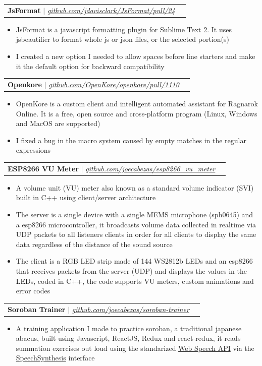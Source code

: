 \documentclass[letterpaper,11pt]{article}
\makeatletter
\newcommand{\resumeItem}[1]{
  \item\small{
    {#1 \vspace{-2pt}}
  }
}
\newcommand{\resumeProjectHeading}[2]{
    \vspace{-2pt}\item
    \begin{tabular*}{0.97\textwidth}{l@{\extracolsep{\fill}}r}
      \small#1 & #2 \\
    \end{tabular*}\vspace{-7pt}
}
\newcommand{\resumeItemListStart}{\begin{itemize}}
\newcommand{\resumeItemListEnd}{\end{itemize}\vspace{-5pt}}
\makeatother
\begin{document}
      \resumeProjectHeading
        {\textbf{JsFormat} $|$ \emph{\href{https://github.com/jdavisclark/JsFormat/pull/24}{\color{blue}github.com/jdavisclark/JsFormat/pull/24}}}{}
          \resumeItemListStart
            \resumeItem{JsFormat is a javascript formatting plugin for Sublime Text 2. It uses jsbeautifier to format whole js or json files, or the selected portion(s)}
            \resumeItem{I created a new option I needed to allow spaces before line starters and make it the default option for backward compatibility}
          \resumeItemListEnd
      
      \resumeProjectHeading
        {\textbf{Openkore} $|$ \emph{\href{https://github.com/OpenKore/openkore/pull/1110}{\color{blue}github.com/OpenKore/openkore/pull/1110}}}{}
          \resumeItemListStart
            \resumeItem{OpenKore is a custom client and intelligent automated assistant for Ragnarok Online. It is a free, open source and cross-platform program (Linux, Windows and MacOS are supported)}
            \resumeItem{I fixed a bug in the macro system caused by empty matches in the regular expressions}
          \resumeItemListEnd
      
      \resumeProjectHeading
        {\textbf{ESP8266 VU Meter} $|$ \emph{\href{https://github.com/joecabezas/esp8266\_vu\_meter}{\color{blue}github.com/joecabezas/esp8266\_vu\_meter}}}{}
          \resumeItemListStart
            \resumeItem{A volume unit (VU) meter also known as a standard volume indicator (SVI) built in C++ using client/server architecture}
            \resumeItem{The server is a single device with a single MEMS microphone (sph0645) and a esp8266 microcontroller, it broadcasts volume data collected in realtime via UDP packets to all listeners clients in order for all clients to display the same data regardless of the distance of the sound source}
            \resumeItem{The client is a RGB LED strip made of 144 WS2812b LEDs and an esp8266 that receives packets from the server (UDP) and displays the values in the LEDs, coded in C++, the code supports VU meters, custom animations and error codes}
          \resumeItemListEnd
      
      \resumeProjectHeading
        {\textbf{Soroban Trainer} $|$ \emph{\href{https://github.com/joecabezas/soroban-trainer}{\color{blue}github.com/joecabezas/soroban-trainer}}}{}
          \resumeItemListStart
            \resumeItem{A training application I made to practice soroban, a traditional japanese abacus, built using Javascript, ReactJS, Redux and react-redux, it reads summation exercises out loud using the standarized \href{https://developer.mozilla.org/en-US/docs/Web/API/Web_Speech_API}{\color{blue}Web Speech API} via the \href{https://developer.mozilla.org/en-US/docs/Web/API/SpeechSynthesis}{\color{blue}SpeechSynthesis} interface}
          \resumeItemListEnd
      
\end{document}
